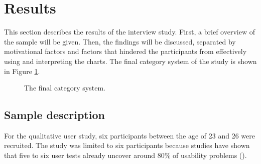 \section{Results}
This section describes the results of the interview study. First, a brief overview of the sample will be given. Then, the findings will be discussed, separated by motivational factors and factors that hindered the participants from effectively using and interpreting the charts. The final category system of the study is shown in Figure \ref{fig:category_system}.

\begin{figure}[htb!]
    \centering
    \caption{The final category system.}
    \label{fig:category_system}
\end{figure}

\subsection{Sample description}
For the qualitative user study, six participants between the age of 23 and 26 were recruited. The study was limited to six participants because studies have shown that five to six user tests already uncover around 80\% of usability problems (\cite{10.1145/169059.169166}).

